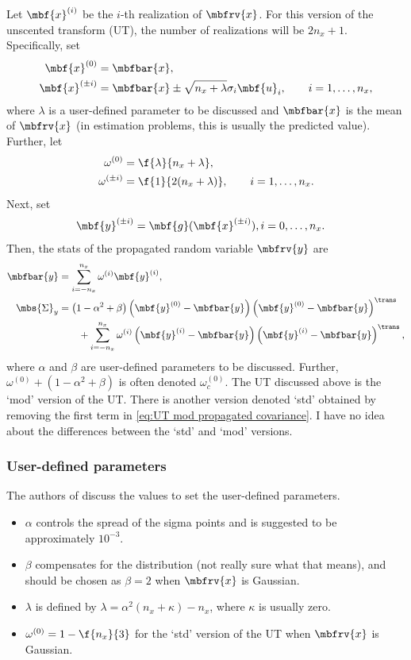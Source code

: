 Let $\mbf{x}^{(i)}$ be the $i$-th realization of $\mbfrv{x}$. For this version of the unscented transform (UT), the number of realizations will be $2n_{x}+1$. Specifically, set
\begin{align}
    \mbf{x}^{(0)} &= \mbfbar{x}, \\
    \mbf{x}^{(\pm i)} &= \mbfbar{x} \pm \sqrt{n_{x} + \lambda} \sigma_{i}\mbf{u}_{i}, \qquad i=1,\ldots,n_{x},
\end{align}
where $\lambda$ is a user-defined parameter to be discussed and $\mbfbar{x}$ is the mean of $\mbfrv{x}$ (in estimation problems, this is usually the predicted value). 
Further, let 
\begin{align}
    \omega^{(0)} &= \f{\lambda}{n_{x} + \lambda}, \\
    \omega^{(\pm i)} &= \f{1}{2(n_{x}+\lambda)}, \qquad i=1,\ldots,n_{x}.
\end{align}
Next, set
\begin{align}
    \mbf{y}^{(\pm i)} &= \mbf{g}(\mbf{x}^{(\pm i)}), i = 0, \ldots, n_{x}.
\end{align}
Then, the stats of the propagated random variable $\mbfrv{y}$ are
\begin{align}
    \mbfbar{y} &= \sum_{i=-n_{x}}^{n_{x}} \omega^{(i)}\mbf{y}^{(i)},\\
    \label{eq:UT mod propagated covariance}
    \mbs{\Sigma}_{y} &= \left( 1-\alpha^{2}+\beta\right)\left( \mbf{y}^{(0)}-\mbfbar{y} \right)\left( \mbf{y}^{(0)}-\mbfbar{y} \right)^{\trans} \\
    &\qquad +\sum_{i=-n_{x}}^{n_{x}} \omega^{(i)}\left( \mbf{y}^{(i)}-\mbfbar{y} \right)\left( \mbf{y}^{(i)}-\mbfbar{y} \right)^{\trans},
\end{align}
where $\alpha$ and $\beta$ are user-defined parameters to be discussed. Further, $\omega^{(0)}+(1-\alpha^{2}+\beta)$ is often denoted $\omega^{(0)}_{c}$. The UT discussed above is the `mod' version of the UT. There is another version denoted `std' obtained by removing the first term in \eqref{eq:UT mod propagated covariance}. I have no idea about the differences between the `std' and `mod' versions.

\subsubsection*{User-defined parameters}
The authors of \cite{gustafsson_nonlinear_2008} discuss the values to set the user-defined parameters. 
\begin{itemize}
    \item $\alpha$ controls the spread of the sigma points and is suggested to be approximately $10^{-3}$.
    \item $\beta$ compensates for the distribution (not really sure what that means), and should be chosen as $\beta=2$ when $\mbfrv{x}$ is Gaussian.
    \item $\lambda$ is defined by $\lambda = \alpha^{2}\left( n_{x}+\kappa \right)-n_{x}$, where $\kappa$ is usually zero.
    \item $\omega^{(0)} = 1 - \f{n_{x}}{3}$ for the `std' version of the UT when $\mbfrv{x}$ is Gaussian.
\end{itemize}

